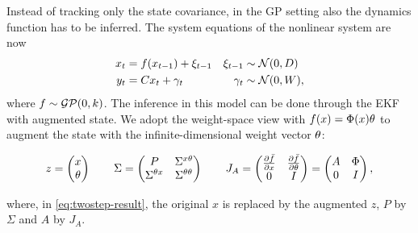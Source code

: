 Instead of tracking only the state covariance, in the GP setting also the
dynamics function has to be inferred. The system equations of the nonlinear
system are now
\begin{subequations}
\label{eq:system-equations-augmented}
\begin{align}
  x_t &= f( x_{t-1}) + \xi_{t-1}  & \xi_{t-1}&\sim\mathcal{N}(0,D)\\
  y_t &= C x_t + \gamma_t  & \gamma_t&\sim\mathcal{N}(0,W),
\end{align}
\end{subequations}
where $f \sim \mathcal{GP}(0,k)$. The inference in this model can be done through the
EKF with augmented state. We adopt the weight-space view with $f(x) =
\Phi(x) \theta$ \cite[]{Rasmussen.Williams:2006:Gaussian} to augment the state
with the infinite-dimensional weight vector $\theta$:
\begin{fullwidth}\vspace{-\baselineskip}
\begin{equation}
  z = \begin{pmatrix}x\\\theta\end{pmatrix} \qquad
  \Sigma = \begin{pmatrix} P & \Sigma^{x\theta} \\ \Sigma^{\theta x} & \Sigma^{\theta\theta}
\end{pmatrix} \qquad
  J_A = \begin{pmatrix} \frac{\partial \bar f}{\partial x} & \frac{\partial \bar f}{\partial \theta} \\
  0 & I \end{pmatrix}
  = \begin{pmatrix} A & \Phi \\
  0 & I \end{pmatrix},
\end{equation}
\end{fullwidth}
where, in \eqref{eq:twostep-result}, the original $x$ is replaced by the
augmented $z$, $P$ by $\Sigma$ and $A$ by $J_A$.

